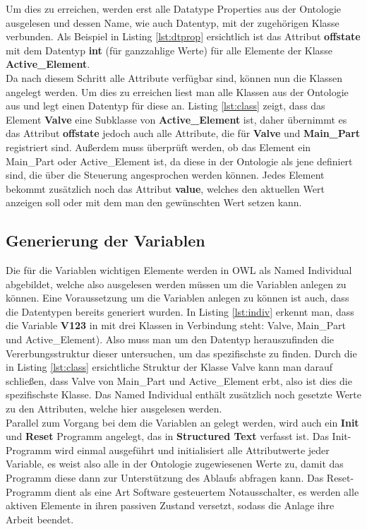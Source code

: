 Um dies zu erreichen, werden erst alle Datatype Properties aus der Ontologie ausgelesen und dessen Name, wie auch Datentyp, mit der zugehörigen Klasse verbunden. Als Beispiel in Listing \ref{lst:dtprop} ersichtlich ist das Attribut \textbf{offstate} mit dem Datentyp \textbf{int} (für ganzzahlige Werte) für alle Elemente der Klasse \textbf{Active\_Element}.\\

Da nach diesem Schritt alle Attribute verfügbar sind, können nun die Klassen angelegt werden. Um dies zu erreichen liest man alle Klassen aus der Ontologie aus und legt einen Datentyp für diese an. Listing \ref{lst:class} zeigt, dass das Element \textbf{Valve} eine Subklasse von \textbf{Active\_Element} ist, daher übernimmt es das Attribut \textbf{offstate} jedoch auch alle Attribute, die für \textbf{Valve} und \textbf{Main\_Part} registriert sind. Außerdem muss überprüft werden, ob das Element ein Main\_Part oder Active\_Element ist, da diese in der Ontologie als jene definiert sind, die über die Steuerung angesprochen werden können. Jedes Element bekommt zusätzlich noch das Attribut \textbf{value}, welches den aktuellen Wert anzeigen soll oder mit dem man den gewünschten Wert setzen kann.

\subsection{Generierung der Variablen}
Die für die Variablen wichtigen Elemente werden in \ac{OWL} als Named Individual abgebildet, welche also ausgelesen werden müssen um die Variablen anlegen zu können. Eine Voraussetzung um die Variablen anlegen zu können ist auch, dass die Datentypen bereits generiert wurden. In Listing \ref{lst:indiv} erkennt man, dass die Variable \textbf{V123} in mit drei Klassen in Verbindung steht: Valve, Main\_Part und Active\_Element). Also muss man um den Datentyp herauszufinden die Vererbungsstruktur dieser untersuchen, um das spezifischste zu finden. Durch die in Listing \ref{lst:class} ersichtliche Struktur der Klasse Valve kann man darauf schließen, dass Valve von Main\_Part und Active\_Element erbt, also ist dies die spezifischste Klasse. Das Named Individual enthält zusätzlich noch gesetzte Werte zu den Attributen, welche hier ausgelesen werden.\\

Parallel zum Vorgang bei dem die Variablen an gelegt werden, wird auch ein \textbf{Init} und \textbf{Reset} Programm angelegt, das in \textbf{Structured Text} verfasst ist. Das Init-Programm wird einmal ausgeführt und initialisiert alle Attributwerte jeder Variable, es weist also alle in der Ontologie zugewiesenen Werte zu, damit das Programm diese dann zur Unterstützung des Ablaufs abfragen kann. Das Reset-Programm dient als eine Art Software gesteuertem Notausschalter, es werden alle aktiven Elemente in ihren passiven Zustand versetzt, sodass die Anlage ihre Arbeit beendet.

